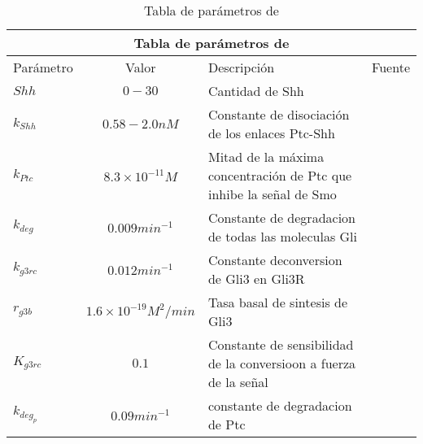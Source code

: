 \begin{table}[h]
\begin{center}
	
	\begin{tabular}{ |p{3cm}||c|p{3cm}|p{3cm}|  }
		\hline
		\multicolumn{4}{|c|}{Tabla de parámetros de \cite{schaffer}  } \\
		\hline
		Parámetro & Valor & Descripción & Fuente\\
		\hline
		$Shh $  & $0-30$    &\tiny{Cantidad de Shh} &   \cite{cambon1}\\
		$k_{Shh}$ &  $ 0.58-2.0nM$  & \tiny{Constante de disociación de los enlaces Ptc-Shh}   & \cite{cambon1}\\
		$k_{Ptc} $ & $8.3\times10^{-11}M$ & \tiny{ Mitad de la máxima concentración de Ptc que inhibe la señal de Smo } &  \cite{cambon1}\\
		$k_{deg}$   &$0.009min^{-1} $ & \tiny{ Constante de degradacion de todas las moleculas Gli } &  \cite{cambon1}\\
		
		$k_{g3rc}$ &  $0.012min^{-1}$  & \tiny{ Constante deconversion de Gli3 en Gli3R} & \cite{schaffer}\\
		$r_{g3b}$ & $1.6\times10^{-19}M^2/min$  & \tiny{ Tasa basal de sintesis de Gli3 }   & \cite{schaffer}\\
		$K_{g3rc}$ & $0.1$ & \tiny{ Constante de sensibilidad de la conversioon a fuerza de la señal }   & \cite{schaffer}\\
		
		$k_{deg_p}$& $0.09min^{-1} $ &  \tiny{constante de degradacion de Ptc} & \cite{cambon1}\\
		
		\hline
	\end{tabular}
	
\end{center}
\caption{Tabla de parámetros de \cite{schaffer} }\label{param_2}
\end{table}